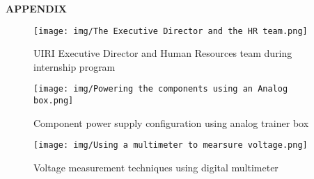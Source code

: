 \documentclass[12pt,a4paper]{report}
\begin{document}
\newpage
\appendix

{\fontsize{14}{16.8}\selectfont\bfseries\centering APPENDIX\par}
\vspace{10pt}

\begin{figure}[H]
\centering
\texttt{[image: img/The Executive Director and the HR team.png]}
\caption{UIRI Executive Director and Human Resources team during internship program}
\label{fig:uiri-leadership}
\end{figure}

\begin{figure}[H]
\centering
\texttt{[image: img/Powering the components using an Analog box.png]}
\caption{Component power supply configuration using analog trainer box}
\label{fig:analog-power}
\end{figure}

\begin{figure}[H]
\centering
\texttt{[image: img/Using a multimeter to mearsure voltage.png]}
\caption{Voltage measurement techniques using digital multimeter}
\label{fig:multimeter-usage}
\end{figure}
\end{document}
